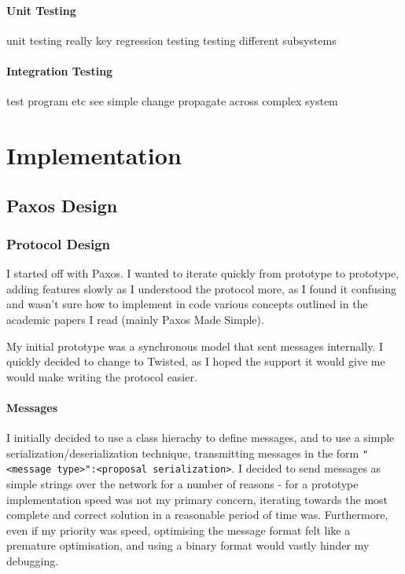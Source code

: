 \documentclass[12pt,twoside,notitlepage]{report}
\begin{document}
\subsubsection{Unit Testing}

unit testing really key
regression testing
testing different subsystems

\subsubsection{Integration Testing}

test program etc
see simple change propagate across complex system



\cleardoublepage
\chapter{Implementation}

\section{Paxos Design}

\subsection{Protocol Design}

I started off with Paxos. I wanted to iterate quickly from prototype to prototype, adding features
slowly as I understood the protocol more, as I found it confusing and wasn't sure how to implement
in code various concepts outlined in the academic papers I read (mainly Paxos Made Simple).

My initial prototype was a synchronous model that sent messages internally. I quickly decided to
change to Twisted, as I hoped the support it would give me would make writing the protocol easier.

\subsubsection*{Messages}
I initially decided to use a class hierachy to define messages, and to use a simple
serialization/deserialization technique, transmitting messages in the form
\verb+"<message type>":<proposal serialization>+. I decided to send messages as simple strings
over the network for a number of reasons - for a prototype implementation speed was not my primary
concern, iterating towards the most complete and correct solution in a reasonable period of time
was. Furthermore, even if my priority was speed, optimising the message format felt like a
premature optimisation, and using a binary format would vastly hinder my debugging.
\end{document}
